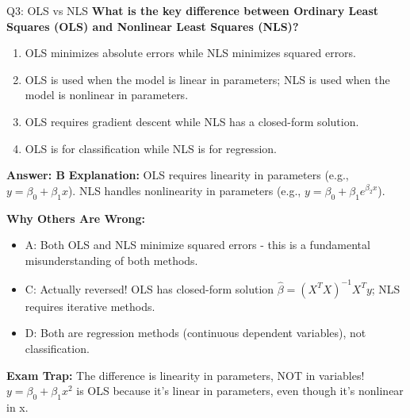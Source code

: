 \documentclass[8pt]{beamer}
\begin{document}
	\begin{frame}{Q3: OLS vs NLS}
		\fontsize{6.5}{7.5}\selectfont
		\textbf{What is the key difference between Ordinary Least Squares (OLS) and Nonlinear Least Squares (NLS)?}
		
		\begin{enumerate}
			\item OLS minimizes absolute errors while NLS minimizes squared errors.
			\item OLS is used when the model is linear in parameters; NLS is used when the model is nonlinear in parameters.
			\item OLS requires gradient descent while NLS has a closed-form solution.
			\item OLS is for classification while NLS is for regression.
		\end{enumerate}
		
		\vspace{0.05cm}
		\textcolor{myblue}{\textbf{Answer: B}}
		\vspace{0.05cm}
		\textcolor{myblue}{\textbf{Explanation:}} OLS requires linearity in parameters (e.g., $y = \beta_0 + \beta_1 x$). NLS handles nonlinearity in parameters (e.g., $y = \beta_0 + \beta_1 e^{\beta_2 x}$).
		
		\vspace{0.05cm}
		\textcolor{myred}{\textbf{Why Others Are Wrong:}}
		\begin{itemize}
			\item \textcolor{myred}{A:} Both OLS and NLS minimize squared errors - this is a fundamental misunderstanding of both methods.
			\item \textcolor{myred}{C:} Actually reversed! OLS has closed-form solution $\hat{\beta} = (X^TX)^{-1}X^Ty$; NLS requires iterative methods.
			\item \textcolor{myred}{D:} Both are regression methods (continuous dependent variables), not classification.
		\end{itemize}
		
		\textcolor{myred}{\textbf{Exam Trap:}} The difference is \textcolor{myblue}{linearity in parameters}, NOT in variables! $y = \beta_0 + \beta_1 x^2$ is OLS because it's linear in parameters, even though it's nonlinear in x.
	\end{frame}
	
\end{document}
